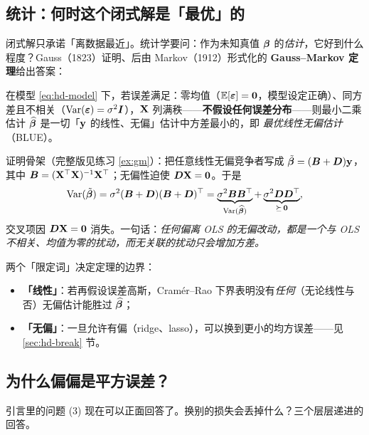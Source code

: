 \subsection{统计：何时这个闭式解是「最优」的}\label{sec:hd-gm}

闭式解只承诺「离数据最近」。统计学要问：作为未知真值 $\bm{\beta}$ 的\textit{估计}，它好到什么程度？Gauss（1823）证明、后由 Markov（1912）形式化的 \textbf{Gauss--Markov 定理}给出答案\cite{gauss1823}：

\begin{keybox}
在模型 \eqref{eq:hd-model} 下，若误差满足：零均值（$\mathbb{E}[\bm{\varepsilon}] = \mathbf{0}$，模型设定正确）、同方差且不相关（$\mathrm{Var}(\bm{\varepsilon}) = \sigma^2 \bm{I}$），$\mathbf{X}$ 列满秩——\textbf{不假设任何误差分布}——则最小二乘估计 $\widehat{\bm{\beta}}$ 是一切「$\mathbf{y}$ 的线性、无偏」估计中方差最小的，即 \emph{最优线性无偏估计}（BLUE）。
\end{keybox}

证明骨架（完整版见练习 \ref{ex:gm}）：把任意线性无偏竞争者写成 $\tilde{\bm{\beta}} = (\bm{B} + \bm{D})\mathbf{y}$，其中 $\bm{B} = (\mathbf{X}^\top\mathbf{X})^{-1}\mathbf{X}^\top$；无偏性迫使 $\bm{D}\mathbf{X} = \mathbf{0}$。于是
\[
  \mathrm{Var}(\tilde{\bm{\beta}}) = \sigma^2(\bm{B} + \bm{D})(\bm{B} + \bm{D})^\top
  = \underbrace{\sigma^2 \bm{B}\bm{B}^\top}_{\mathrm{Var}(\widehat{\bm{\beta}})} + \underbrace{\sigma^2 \bm{D}\bm{D}^\top}_{\succeq\, \mathbf{0}},
\]
交叉项因 $\bm{D}\mathbf{X} = \mathbf{0}$ 消失。一句话：\textit{任何偏离 OLS 的无偏改动，都是一个与 OLS 不相关、均值为零的扰动，而无关联的扰动只会增加方差。}

两个「限定词」决定定理的边界：
\begin{itemize}
  \item \textbf{「线性」}：若再假设误差高斯，Cram\'er--Rao 下界表明没有\textit{任何}（无论线性与否）无偏估计能胜过 $\widehat{\bm{\beta}}$；
  \item \textbf{「无偏」}：一旦允许有偏（ridge、lasso），可以换到更小的均方误差——见 \ref{sec:hd-break} 节。
\end{itemize}

\subsection{为什么偏偏是平方误差？}\label{sec:why-square}

引言里的问题 (3) 现在可以正面回答了。换别的损失会丢掉什么？三个层层递进的回答。

